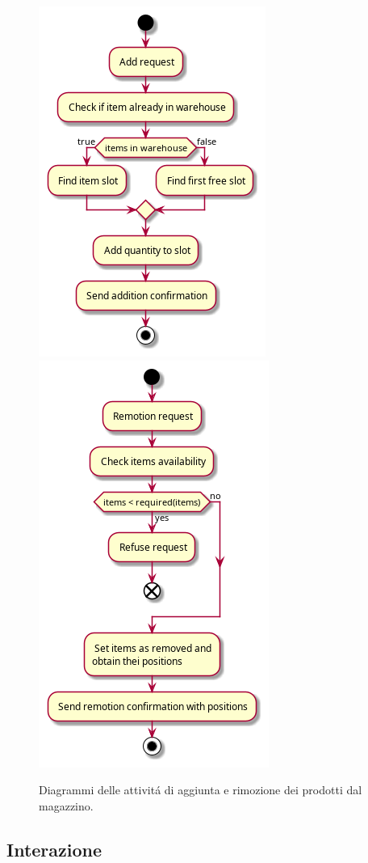 \begin{figure}[!ht]\centering
    \includegraphics[width=.45\textwidth]{section/design/figure/warehouse_mapper/activity_diagram-add.png}
    \includegraphics[width=.45\textwidth]{section/design/figure/warehouse_mapper/activity_diagram-remove.png}
    \caption{Diagrammi delle attivit\'a di aggiunta e rimozione dei prodotti dal magazzino.}
    \label{fig:wm-activity_diagrams}
\end{figure}

\subsection{Interazione}

